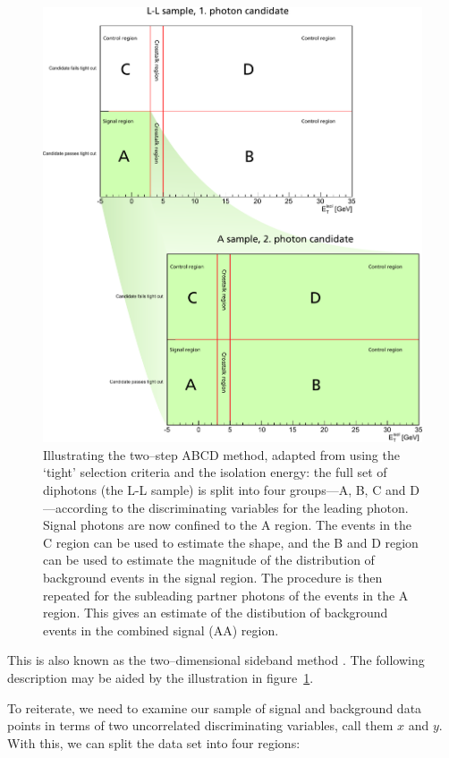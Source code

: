 \begin{figure}[hbp]
  \includegraphics[width=\textwidth]{figures/sideband}
  \caption{Illustrating the two--step ABCD method, adapted from \cite{fdirect} using the `tight' selection criteria and the isolation energy: the full set of diphotons (the L-L sample) is split into four groups---A, B, C and D---according to the discriminating variables for the leading photon. Signal photons are now confined to the A region. The events in the C region can be used to estimate the shape, and the B and D region can be used to estimate the magnitude of the distribution of background events in the signal region. The procedure is then repeated for the subleading partner photons of the events in the A region. This gives an estimate of the distibution of background events in the combined signal (AA) region.}\label{abcd}
\end{figure}

This is also known as the two--dimensional sideband method \cite{cmsabcd}. The following description may be aided by the illustration in figure~\ref{abcd}.

To reiterate, we need to examine our sample of signal and background data points in terms of two uncorrelated discriminating variables, call them $x$ and $y$. With this, we can split the data set into four regions:

